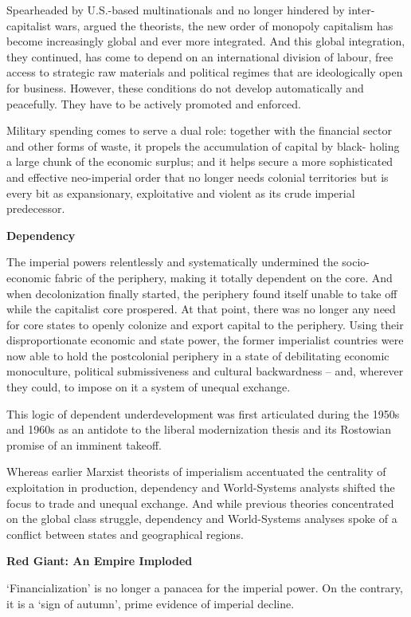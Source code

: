\documentclass[
]{book}
\begin{document}
Spearheaded by U.S.-based multinationals and no longer hindered by inter-
capitalist wars, argued the theorists, the new order of monopoly capitalism has become
increasingly global and ever more integrated. And this global integration, they continued,
has come to depend on an international division of labour, free access to strategic raw
materials and political regimes that are ideologically open for business. However, these
conditions do not develop automatically and peacefully. They have to be actively
promoted and enforced.

Military spending comes to serve a dual role: together with the
financial sector and other forms of waste, it propels the accumulation of capital by black-
holing a large chunk of the economic surplus; and it helps secure a more sophisticated
and effective neo-imperial order that no longer needs colonial territories but is every bit
as expansionary, exploitative and violent as its crude imperial predecessor.

\textbf{Dependency}

The imperial powers relentlessly and systematically
undermined the socio-economic fabric of the periphery, making it totally dependent on
the core. And when decolonization finally started, the periphery found itself unable to
take off while the capitalist core prospered.
At that
point, there was no longer any need for core states to openly colonize and export capital
to the periphery. Using their disproportionate economic and state power, the former
imperialist countries were now able to hold the postcolonial periphery in a state of
debilitating economic monoculture, political submissiveness and cultural backwardness
-- and, wherever they could, to impose on it a system of unequal exchange.

This logic of dependent underdevelopment was first articulated during the
1950s and 1960s as an antidote to the liberal modernization thesis and its Rostowian
promise of an imminent takeoff.

Whereas earlier Marxist
theorists of imperialism accentuated the centrality of exploitation in production,
dependency and World-Systems analysts shifted the focus to trade and unequal
exchange. And while previous theories concentrated on the global class struggle,
dependency and World-Systems analyses spoke of a conflict between states and
geographical regions.

\textbf{Red Giant: An Empire Imploded}

`Financialization' is no longer a panacea for the
imperial power. On the contrary, it is a `sign of autumn', prime evidence of imperial
decline.
\end{document}

